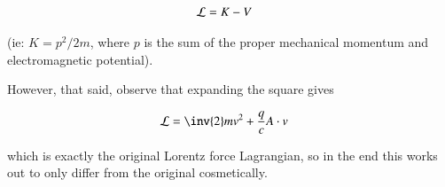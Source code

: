 \documentclass{article}
\begin{document}
\begin{align*}
\mathcal{L} &= K - V
\end{align*}

(ie: $K = p^2/2m$, where $p$ is the sum of the proper mechanical momentum and electromagnetic potential).

However, that said, observe that expanding the square gives

\begin{align*}
\LL &= \inv{2} m v^2 + \frac{q}{c} A \cdot v 
\end{align*}

which is exactly the original Lorentz force Lagrangian, so in the end this works out to only differ from the original cosmetically.



\end{document}
